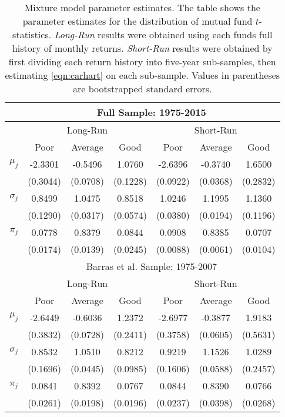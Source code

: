 		\begin{table}[p]
			\small
			\centering
			\begin{tabular}{*{7}{c}}
			\toprule
			& \multicolumn{6}{c}{Full Sample: 1975-2015} \\
			\midrule
			& \multicolumn{3}{c}{Long-Run} & \multicolumn{3}{c}{Short-Run} \\
			\cmidrule(l{2pt}r{2pt}){2-4} \cmidrule(l{2pt}r{2pt}){5-7}
			& Poor & Average & Good & Poor & Average & Good \\
			\midrule
			$\mu_j$ & -2.3301 & -0.5496 & 1.0760 & -2.6396 & -0.3740 & 1.6500 \\
			& (0.3044) & (0.0708) & (0.1228) & (0.0922) & (0.0368) & (0.2832) \\
			$\sigma_j$ & 0.8499 & 1.0475 & 0.8518 & 1.0246 & 1.1995 & 1.1360 \\
			& (0.1290) & (0.0317) & (0.0574) & (0.0380) & (0.0194) & (0.1196) \\
			$\pi_j$ & 0.0778 & 0.8379 & 0.0844 & 0.0908 & 0.8385 & 0.0707 \\
			& (0.0174) & (0.0139) & (0.0245) & (0.0088) & (0.0061) & (0.0104) \\
			\midrule
			& \multicolumn{6}{c}{Barras et al. Sample: 1975-2007} \\
			\midrule
			& \multicolumn{3}{c}{Long-Run} & \multicolumn{3}{c}{Short-Run} \\
			\cmidrule(l{2pt}r{2pt}){2-4} \cmidrule(l{2pt}r{2pt}){5-7}
			& Poor & Average & Good & Poor & Average & Good \\
			\midrule
			$\mu_j$ & -2.6449 & -0.6036 & 1.2372 & -2.6977 & -0.3877 & 1.9183 \\
			& (0.3832) & (0.0728) & (0.2411) & (0.3758) & (0.0605) & (0.5631) \\
			$\sigma_j$ & 0.8532 & 1.0510 & 0.8212 & 0.9219 & 1.1526 & 1.0289 \\
			& (0.1696) & (0.0445) & (0.0985) & (0.1606) & (0.0588) & (0.2457) \\
			$\pi_j$ & 0.0841 & 0.8392 & 0.0767 & 0.0844 & 0.8390 & 0.0766 \\
			& (0.0261) & (0.0198) & (0.0196) & (0.0237) & (0.0398) & (0.0268) \\
			\bottomrule
			\end{tabular}
			\captionsetup{position=below, font=footnotesize, justification=justified, width=0.77\linewidth}
			\caption[Mixture model parameter estimates]{Mixture model parameter estimates. The table shows the parameter estimates for the distribution of mutual fund $t$-statistics. \textit{Long-Run} results were obtained using each funds full history of monthly returns. \textit{Short-Run} results were obtained by first dividing each return history into five-year sub-samples, then estimating \eqref{eqn:carhart} on each sub-sample. Values in parentheses are bootstrapped standard errors.}
			\label{tab:main}
		\end{table}

